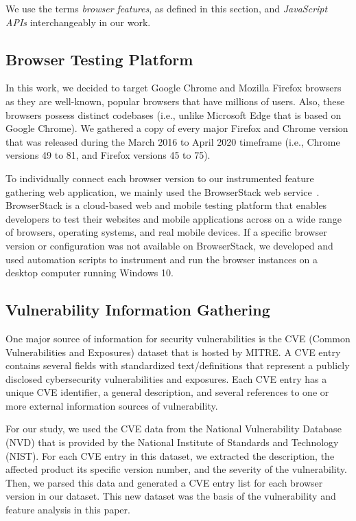 We use the terms \textit{browser features}, as defined in this section,
and \textit{JavaScript APIs} interchangeably in our work.




\subsection{Browser Testing Platform}

In this work, we decided to target Google Chrome and Mozilla
Firefox browsers as they are well-known, popular browsers that have
millions of users. Also, these browsers possess distinct codebases
(i.e., unlike Microsoft Edge that is based on Google Chrome). We
gathered a copy of every major Firefox and Chrome version that was
released during the March 2016 to April 2020 timeframe (i.e., Chrome
versions 49 to 81, and Firefox versions 45 to 75).

To individually connect each browser version to our instrumented
feature gathering web application, we mainly used the BrowserStack web
service~\cite{browserstack}. BrowserStack is a cloud-based web and mobile testing platform
that enables developers to test their websites and mobile applications
across on a wide range of browsers, operating systems, and real mobile
devices. If a specific browser version or configuration was not
available on BrowserStack, we developed and used automation scripts to
instrument and run the browser instances on a desktop computer running
Windows 10.

\subsection{Vulnerability Information Gathering}

One major source of information for security vulnerabilities is the
CVE (Common Vulnerabilities and Exposures) dataset that is hosted by
MITRE. A CVE entry contains several fields with standardized
text/definitions that represent a publicly disclosed cybersecurity
vulnerabilities and exposures. Each CVE entry has a unique CVE
identifier, a general description, and several references to one or
more external information sources of vulnerability.

For our study, we used the CVE data from the National Vulnerability
Database (NVD) that is provided by the National Institute of Standards
and Technology (NIST). For each CVE entry in this dataset, we
extracted the description, the affected product its specific version
number, and the severity of the vulnerability. Then, we parsed this
data and generated a CVE entry list for each browser version in our
dataset. This new dataset was the basis of the vulnerability and
feature analysis in this paper.
